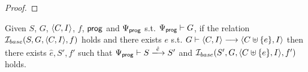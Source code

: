 \documentclass[12pt]{article}
\begin{document}
\begin{proof}
    

    
  
\end{proof}

\begin{lemma}
  Given $S$, $G$, $\langle C, I \rangle$, $f$, $\mathsf{prog}$ and $\Psi_{\mathsf{prog}}$
  s.t. $\Psi_{\mathsf{prog}} \vdash G$,
  if the relation $\mathcal{I}_{base}(S, G, \langle C, I \rangle, f)$ holds and
  there exists $e$ s.t. $G \vdash \langle C, I \rangle \longrightarrow \langle C \uplus \{e\}, I \rangle$ then
  there exists $\hat{e}, S', f'$ such that
  $\Execs{\Prog} \vdash S \esstep{\hat{e}} S'$
  and $\mathcal{I}_{base}(S', G, \langle C \uplus \{e\}, I \rangle, f')$ holds.
\end{lemma}
\end{document}
